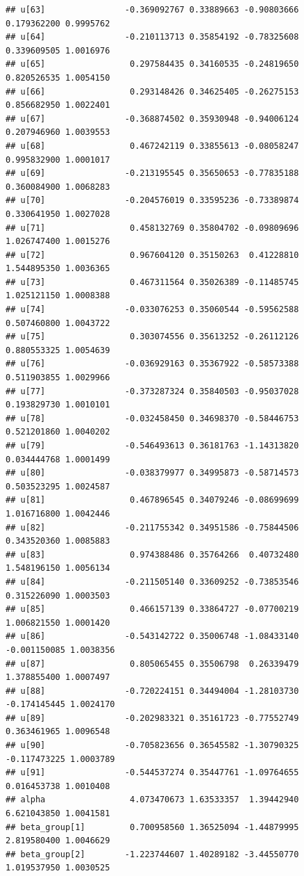 \documentclass[
]{article}
\begin{document}
\begin{verbatim}
## u[63]                -0.369092767 0.33889663 -0.90803666  0.179362200 0.9995762
## u[64]                -0.210113713 0.35854192 -0.78325608  0.339609505 1.0016976
## u[65]                 0.297584435 0.34160535 -0.24819650  0.820526535 1.0054150
## u[66]                 0.293148426 0.34625405 -0.26275153  0.856682950 1.0022401
## u[67]                -0.368874502 0.35930948 -0.94006124  0.207946960 1.0039553
## u[68]                 0.467242119 0.33855613 -0.08058247  0.995832900 1.0001017
## u[69]                -0.213195545 0.35650653 -0.77835188  0.360084900 1.0068283
## u[70]                -0.204576019 0.33595236 -0.73389874  0.330641950 1.0027028
## u[71]                 0.458132769 0.35804702 -0.09809696  1.026747400 1.0015276
## u[72]                 0.967604120 0.35150263  0.41228810  1.544895350 1.0036365
## u[73]                 0.467311564 0.35026389 -0.11485745  1.025121150 1.0008388
## u[74]                -0.033076253 0.35060544 -0.59562588  0.507460800 1.0043722
## u[75]                 0.303074556 0.35613252 -0.26112126  0.880553325 1.0054639
## u[76]                -0.036929163 0.35367922 -0.58573388  0.511903855 1.0029966
## u[77]                -0.373287324 0.35840503 -0.95037028  0.193829730 1.0010101
## u[78]                -0.032458450 0.34698370 -0.58446753  0.521201860 1.0040202
## u[79]                -0.546493613 0.36181763 -1.14313820  0.034444768 1.0001499
## u[80]                -0.038379977 0.34995873 -0.58714573  0.503523295 1.0024587
## u[81]                 0.467896545 0.34079246 -0.08699699  1.016716800 1.0042446
## u[82]                -0.211755342 0.34951586 -0.75844506  0.343520360 1.0085883
## u[83]                 0.974388486 0.35764266  0.40732480  1.548196150 1.0056134
## u[84]                -0.211505140 0.33609252 -0.73853546  0.315226090 1.0003503
## u[85]                 0.466157139 0.33864727 -0.07700219  1.006821550 1.0001420
## u[86]                -0.543142722 0.35006748 -1.08433140 -0.001150085 1.0038356
## u[87]                 0.805065455 0.35506798  0.26339479  1.378855400 1.0007497
## u[88]                -0.720224151 0.34494004 -1.28103730 -0.174145445 1.0024170
## u[89]                -0.202983321 0.35161723 -0.77552749  0.363461965 1.0096548
## u[90]                -0.705823656 0.36545582 -1.30790325 -0.117473225 1.0003789
## u[91]                -0.544537274 0.35447761 -1.09764655  0.016453738 1.0010408
## alpha                 4.073470673 1.63533357  1.39442940  6.621043850 1.0041581
## beta_group[1]         0.700958560 1.36525094 -1.44879995  2.819580400 1.0046629
## beta_group[2]        -1.223744607 1.40289182 -3.44550770  1.019537950 1.0030525

\end{verbatim}
\end{document}
